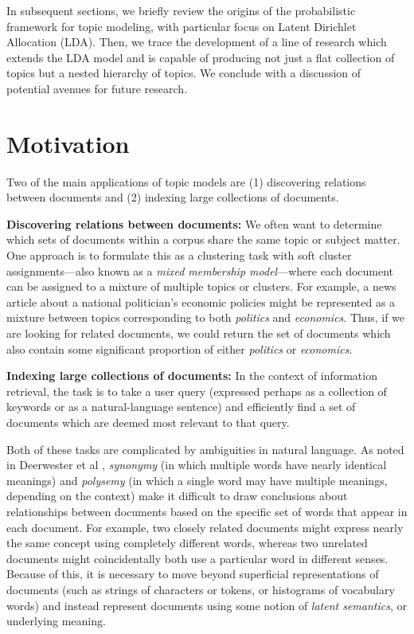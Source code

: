 \documentclass{article}
\begin{document}
In subsequent sections, we briefly review the origins of the probabilistic framework for topic modeling, with particular focus on Latent Dirichlet Allocation (LDA).
Then, we trace the development of a line of research which extends the LDA model and is capable of producing not just a flat collection of topics but a nested hierarchy of topics.
We conclude with a discussion of potential avenues for future research.

\section{Motivation}
Two of the main applications of topic models are (1) discovering relations between documents and (2) indexing large collections of documents.

\textbf{Discovering relations between documents:}
We often want to determine which sets of documents within a corpus share the same topic or subject matter.
One approach is to formulate this as a clustering task with soft cluster assignments---also known as a \emph{mixed membership model}---where each document can be assigned to a mixture of multiple topics or clusters.
For example, a news article about a national politician's economic policies might be represented as a mixture between topics corresponding to both \emph{politics} and \emph{economics}.
Thus, if we are looking for related documents, we could return the set of documents which also contain some significant proportion of either \emph{politics} or \emph{economics}.

\textbf{Indexing large collections of documents:}
In the context of information retrieval, the task is to take a user query (expressed perhaps as a collection of keywords or as a natural-language sentence) and efficiently find a set of documents which are deemed most relevant to that query.

Both of these tasks are complicated by ambiguities in natural language.
As noted in Deerwester et al \cite{deerwester1990lsa}, \emph{synonymy} (in which multiple words have nearly identical meanings) and \emph{polysemy} (in which a single word may have multiple meanings, depending on the context) make it difficult to draw conclusions about relationships between documents based on the specific set of words that appear in each document.
For example, two closely related documents might express nearly the same concept using completely different words, whereas two unrelated documents might coincidentally both use a particular word in different senses.
Because of this, it is necessary to move beyond superficial representations of documents (such as strings of characters or tokens, or histograms of vocabulary words) and instead represent documents using some notion of \emph{latent semantics}, or underlying meaning.
\end{document}
